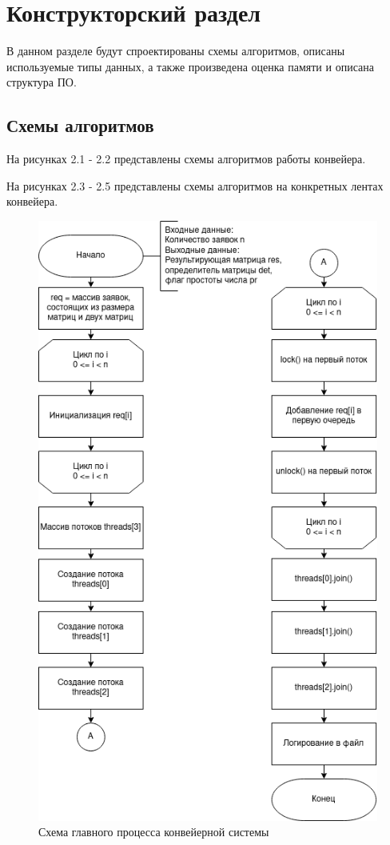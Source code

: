 \chapter{Конструкторский раздел}

В данном разделе будут спроектированы схемы алгоритмов, описаны используемые типы данных, а также произведена оценка памяти и описана структура ПО.

\section{Схемы алгоритмов}

На рисунках 2.1 - 2.2 представлены схемы алгоритмов работы конвейера.

На рисунках 2.3 - 2.5 представлены схемы алгоритмов на конкретных лентах конвейера.

\begin{figure}[H]
	\begin{center}
		\includegraphics[scale=0.7]{assets/main.png}
	\end{center}
	\caption{Схема главного процесса конвейерной системы}
\end{figure}

